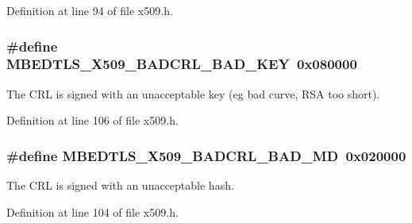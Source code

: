 Definition at line 94 of file x509.\-h.

\hypertarget{group__x509__module_gac2947ead6fd1035296826110ca74a364}{
\subsubsection[{M\-B\-E\-D\-T\-L\-S\-\_\-\-X509\-\_\-\-B\-A\-D\-C\-R\-L\-\_\-\-B\-A\-D\-\_\-\-K\-E\-Y}]{\setlength{\rightskip}{0pt plus 5cm}\#define M\-B\-E\-D\-T\-L\-S\-\_\-\-X509\-\_\-\-B\-A\-D\-C\-R\-L\-\_\-\-B\-A\-D\-\_\-\-K\-E\-Y~0x080000}}\label{group__x509__module_gac2947ead6fd1035296826110ca74a364}
The C\-R\-L is signed with an unacceptable key (eg bad curve, R\-S\-A too short). 

Definition at line 106 of file x509.\-h.

\hypertarget{group__x509__module_gad3f810fb74f94164185b88b90fffa329}{
\subsubsection[{M\-B\-E\-D\-T\-L\-S\-\_\-\-X509\-\_\-\-B\-A\-D\-C\-R\-L\-\_\-\-B\-A\-D\-\_\-\-M\-D}]{\setlength{\rightskip}{0pt plus 5cm}\#define M\-B\-E\-D\-T\-L\-S\-\_\-\-X509\-\_\-\-B\-A\-D\-C\-R\-L\-\_\-\-B\-A\-D\-\_\-\-M\-D~0x020000}}\label{group__x509__module_gad3f810fb74f94164185b88b90fffa329}
The C\-R\-L is signed with an unacceptable hash. 

Definition at line 104 of file x509.\-h.

